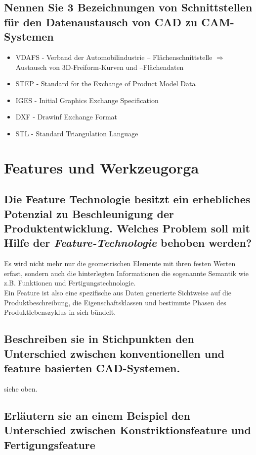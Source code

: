 \subsection*{Nennen Sie 3 Bezeichnungen von Schnittstellen für den Datenaustausch von CAD zu CAM-Systemen}

\begin{itemize}
\item VDAFS - Verband der Automobilindustrie – Flächenschnittstelle $\Rightarrow$ Austausch von 3D-Freiform-Kurven und –Flächendaten 
\item STEP - Standard for the Exchange of Product Model Data 
\item IGES - Initial Graphics Exchange Specification 
\item DXF - Drawinf Exchange Format 
\item STL - Standard Triangulation Language 
\end{itemize}


\newpage


\section{Features und Werkzeugorga}


\subsection*{Die Feature Technologie besitzt ein erhebliches Potenzial zu Beschleunigung der Produktentwicklung. Welches Problem soll mit Hilfe der \textit{Feature-Technologie} behoben werden?}

Es wird nicht mehr nur die geometrischen Elemente mit ihren festen Werten erfast, sondern auch die hinterlegten Informationen die sogenannte \glqq Semantik\grqq {} wie z.B. Funktionen und Fertigungstechnologie. \\

Ein Feature ist also eine spezifische aus Daten generierte Sichtweise auf die Produktbeschreibung, die Eigenschaftsklassen und bestimmte Phasen des Produktlebenszyklus in sich bündelt.


\subsection*{Beschreiben sie in Stichpunkten den Unterschied zwischen \glqq konventionellen\grqq {} und feature basierten CAD-Systemen.}


siehe oben.


\subsection*{Erläutern sie an einem Beispiel den Unterschied zwischen \glqq Konstriktionsfeature\grqq {} und \glqq Fertigungsfeature\grqq}


